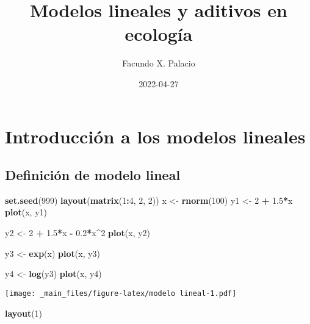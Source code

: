 \documentclass[
]{book}
\title{Modelos lineales y aditivos en ecología}
\author{Facundo X. Palacio}
\date{2022-04-27}
\newenvironment{Shaded}{\begin{snugshade}}{\end{snugshade}}
\newcommand{\DecValTok}[1]{\textcolor[rgb]{0.00,0.00,0.81}{#1}}
\newcommand{\FloatTok}[1]{\textcolor[rgb]{0.00,0.00,0.81}{#1}}
\newcommand{\KeywordTok}[1]{\textcolor[rgb]{0.13,0.29,0.53}{\textbf{#1}}}
\newcommand{\NormalTok}[1]{#1}
\newcommand{\OperatorTok}[1]{\textcolor[rgb]{0.81,0.36,0.00}{\textbf{#1}}}
\newcommand{\StringTok}[1]{\textcolor[rgb]{0.31,0.60,0.02}{#1}}
\begin{document}
\maketitle

{
\setcounter{tocdepth}{1}
\tableofcontents
}
\hypertarget{introducciuxf3n-a-los-modelos-lineales}{%
\chapter{Introducción a los modelos lineales}\label{introducciuxf3n-a-los-modelos-lineales}}

\hypertarget{definiciuxf3n-de-modelo-lineal}{%
\section{Definición de modelo lineal}\label{definiciuxf3n-de-modelo-lineal}}

\begin{Shaded}
\begin{Highlighting}[]
\KeywordTok{set.seed}\NormalTok{(}\DecValTok{999}\NormalTok{)}
\KeywordTok{layout}\NormalTok{(}\KeywordTok{matrix}\NormalTok{(}\DecValTok{1}\OperatorTok{:}\DecValTok{4}\NormalTok{, }\DecValTok{2}\NormalTok{, }\DecValTok{2}\NormalTok{))}
\NormalTok{x <-}\StringTok{ }\KeywordTok{rnorm}\NormalTok{(}\DecValTok{100}\NormalTok{)}
\NormalTok{y1 <-}\StringTok{ }\DecValTok{2} \OperatorTok{+}\StringTok{ }\FloatTok{1.5}\OperatorTok{*}\NormalTok{x}
\KeywordTok{plot}\NormalTok{(x, y1)}

\NormalTok{y2 <-}\StringTok{ }\DecValTok{2} \OperatorTok{+}\StringTok{ }\FloatTok{1.5}\OperatorTok{*}\NormalTok{x }\OperatorTok{-}\StringTok{ }\FloatTok{0.2}\OperatorTok{*}\NormalTok{x}\OperatorTok{^}\DecValTok{2}
\KeywordTok{plot}\NormalTok{(x, y2)}

\NormalTok{y3 <-}\StringTok{ }\KeywordTok{exp}\NormalTok{(x)}
\KeywordTok{plot}\NormalTok{(x, y3)}

\NormalTok{y4 <-}\StringTok{ }\KeywordTok{log}\NormalTok{(y3)}
\KeywordTok{plot}\NormalTok{(x, y4)}
\end{Highlighting}
\end{Shaded}

\texttt{[image: \_main\_files/figure-latex/modelo lineal-1.pdf]}

\begin{Shaded}
\begin{Highlighting}[]
\KeywordTok{layout}\NormalTok{(}\DecValTok{1}\NormalTok{)}
\end{Highlighting}
\end{Shaded}
\end{document}

